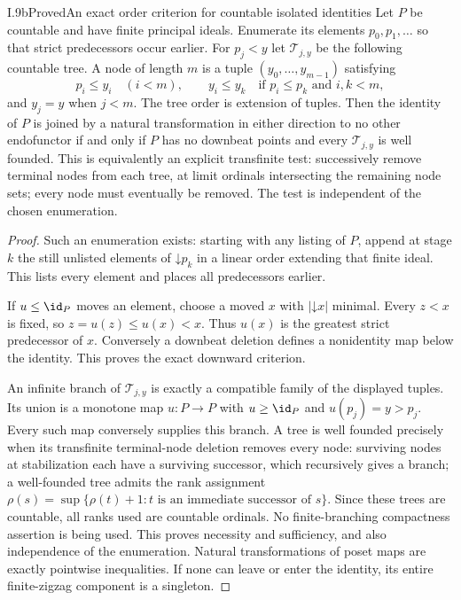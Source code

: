 \begin{claim}{I.9b}{Proved}{An exact order criterion for countable isolated identities}
Let $P$ be countable and have finite principal ideals. Enumerate its
elements $p_0,p_1,\ldots$ so that strict predecessors occur earlier.
For $p_j<y$ let $\mathcal T_{j,y}$ be the following countable tree.
A node of length $m$ is a tuple $(y_0,\ldots,y_{m-1})$ satisfying
\[
 p_i\leq y_i\quad(i<m),\qquad
 y_i\leq y_k\quad\text{if }p_i\leq p_k\text{ and }i,k<m,
\]
and $y_j=y$ when $j<m$. The tree order is extension of tuples.
Then the identity of $P$ is joined by a natural transformation in
either direction to no other endofunctor if and only if
$P$ has no downbeat points and every $\mathcal T_{j,y}$ is
well founded. This is equivalently an explicit transfinite test:
successively remove terminal nodes from each tree, at limit ordinals
intersecting the remaining node sets; every node must eventually be
removed. The test is independent of the chosen enumeration.
\end{claim}
\begin{proof}
Such an enumeration exists: starting with any listing of $P$, append
at stage $k$ the still unlisted elements of $\mathord\downarrow p_k$
in a linear order extending that finite ideal. This lists every
element and places all predecessors earlier.

If $u\leq\id_P$ moves an element, choose a moved $x$ with
$|\mathord\downarrow x|$ minimal. Every $z<x$ is fixed, so
$z=u(z)\leq u(x)<x$. Thus $u(x)$ is the greatest strict predecessor
of $x$. Conversely a downbeat deletion defines a nonidentity map
below the identity. This proves the exact downward criterion.

An infinite branch of $\mathcal T_{j,y}$ is exactly a compatible
family of the displayed tuples. Its union is a monotone map
$u:P\to P$ with $u\geq\id_P$ and $u(p_j)=y>p_j$.
Every such map conversely supplies this branch. A tree is well
founded precisely when its transfinite terminal-node deletion removes
every node: surviving nodes at stabilization each have a surviving
successor, which recursively gives a branch; a well-founded tree
admits the rank assignment
$\rho(s)=\sup\{\rho(t)+1:t\text{ is an immediate successor of }s\}$.
Since these trees are countable, all ranks used are countable
ordinals. No finite-branching compactness assertion is being used.
This proves necessity and sufficiency, and also independence of the
enumeration. Natural transformations of poset maps are exactly
pointwise inequalities. If none can leave or enter the identity,
its entire finite-zigzag component is a singleton.
\end{proof}

